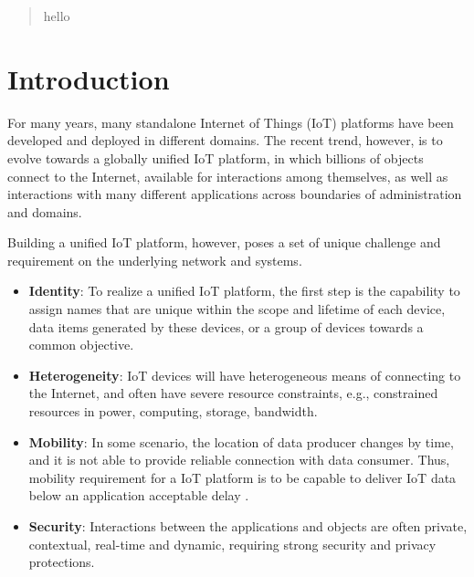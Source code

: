 \begin{abstract}
hello
\end{abstract}

\section{Introduction}
For many years, many standalone Internet of Things (IoT) platforms have been developed and deployed in different domains. The recent trend, however, is to evolve towards a globally unified IoT platform, in which billions of objects connect to the Internet, available for interactions among themselves, as well as interactions with many different applications across boundaries of administration and domains. 


Building a unified IoT platform, however, poses a set of unique challenge and requirement on the underlying network and systems.
\begin{itemize}
\vspace{1mm}\item{\bf Identity}:
To realize a unified IoT platform, the first step is the capability to assign names that are unique within the scope and lifetime of each device, data items generated by these devices, or a group of devices towards a common objective.
\vspace{1mm}\item{\bf Heterogeneity}:
IoT devices will have heterogeneous means of connecting to the Internet, and often have severe resource constraints, e.g., constrained resources in power, computing, storage, bandwidth.
\vspace{1mm}\item{\bf Mobility}:
In some scenario, the location of data producer changes by time, and it is not able to provide reliable connection with data consumer. Thus, mobility requirement for a IoT platform is to be capable to deliver IoT data below an application acceptable delay .
\vspace{1mm}\item{\bf Security}:
Interactions between the applications and objects are often private, contextual, real-time and dynamic, requiring strong security and privacy  protections.
\end{itemize}

